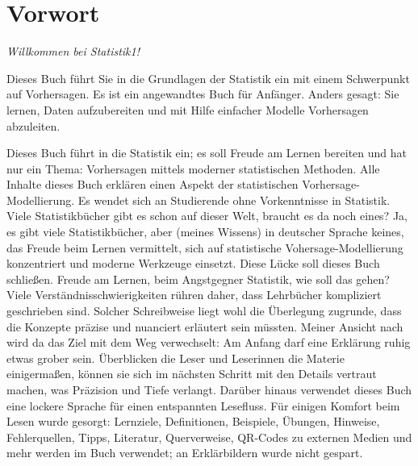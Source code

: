 \documentclass[
  letterpaper,
  twoside,
  open=any]{scrbook}
\theoremstyle{definition}
\theoremstyle{definition}
\theoremstyle{definition}
\theoremstyle{remark}
\begin{document}


\mainmatter
{}

\chapter*{Vorwort}\label{vorwort}


\emph{Willkommen bei Statistik1!}

Dieses Buch führt Sie in die Grundlagen der Statistik ein mit einem
Schwerpunkt auf Vorhersagen. Es ist ein angewandtes Buch für Anfänger.
Anders gesagt: Sie lernen, Daten aufzubereiten und mit Hilfe einfacher
Modelle Vorhersagen abzuleiten.

Dieses Buch führt in die Statistik ein; es soll Freude am Lernen
bereiten und hat nur ein Thema: Vorhersagen mittels moderner
statistischen Methoden. Alle Inhalte dieses Buch erklären einen Aspekt
der statistischen Vorhersage-Modellierung. Es wendet sich an Studierende
ohne Vorkenntnisse in Statistik. Viele Statistikbücher gibt es schon auf
dieser Welt, braucht es da noch eines? Ja, es gibt viele
Statistikbücher, aber (meines Wissens) in deutscher Sprache keines, das
Freude beim Lernen vermittelt, sich auf statistische
Vohersage-Modellierung konzentriert und moderne Werkzeuge einsetzt.
Diese Lücke soll dieses Buch schließen. Freude am Lernen, beim
Angstgegner Statistik, wie soll das gehen? Viele
Verständnisschwierigkeiten rühren daher, dass Lehrbücher kompliziert
geschrieben sind. Solcher Schreibweise liegt wohl die Überlegung
zugrunde, dass die Konzepte präzise und nuanciert erläutert sein
müssten. Meiner Ansicht nach wird da das Ziel mit dem Weg verwechselt:
Am Anfang darf eine Erklärung ruhig etwas grober sein. Überblicken die
Leser und Leserinnen die Materie einigermaßen, können sie sich im
nächsten Schritt mit den Details vertraut machen, was Präzision und
Tiefe verlangt. Darüber hinaus verwendet dieses Buch eine lockere
Sprache für einen entspannten Lesefluss. Für einigen Komfort beim Lesen
wurde gesorgt: Lernziele, Definitionen, Beispiele, Übungen, Hinweise,
Fehlerquellen, Tipps, Literatur, Querverweise, QR-Codes zu externen
Medien und mehr werden im Buch verwendet; an Erklärbildern wurde nicht
gespart.
\end{document}
